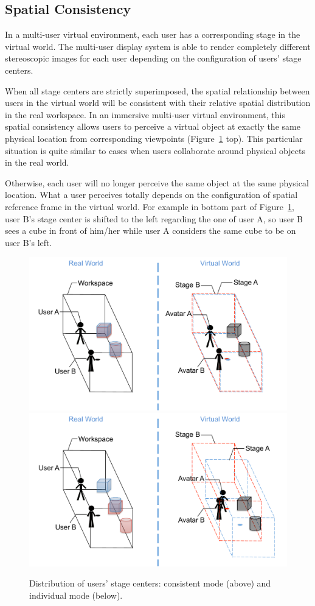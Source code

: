 \subsection{Spatial Consistency}
In a multi-user virtual environment, each user has a corresponding stage in the virtual world. The multi-user display system is able to render completely different stereoscopic images for each user depending on the configuration of users' stage centers.

When all stage centers are strictly superimposed, the spatial relationship between users in the virtual world will be consistent with their relative spatial distribution in the real workspace. In an immersive multi-user virtual environment, this spatial consistency allows users to perceive a virtual object at exactly the same physical location from corresponding viewpoints (Figure~\ref{fig:2_consistency} top). This particular situation is quite similar to cases when users collaborate around physical objects in the real world.

Otherwise, each user will no longer perceive the same object at the same physical location. What a user perceives totally depends on the configuration of spatial reference frame in the virtual world. For example in bottom part of Figure~\ref{fig:2_consistency}, user B's stage center is shifted to the left regarding the one of user A, so user B sees a cube in front of him/her while user A considers the same cube to be on user B's left.

\begin{figure}[htb]
  \centering
  \includegraphics[width=.7\textwidth]{figures/ch2/consistency_1}
  \includegraphics[width=.7\textwidth]{figures/ch2/consistency_2}
  \caption{\label{fig:2_consistency}Distribution of users' stage centers: consistent mode (above) and individual mode (below).}
\end{figure}


